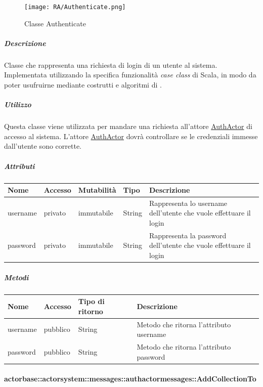 \documentclass{scalatekids-article}
\begin{document}
\begin{figure}[H]
  \begin{center}
    \texttt{[image: RA/Authenticate.png]}
    \caption{Classe Authenticate}
  \end{center}
\end{figure}

\subparagraph{Descrizione}
Classe che rappresenta una richiesta di login di un utente al sistema.\\Implementata utilizzando la specifica funzionalità \textit{case class} di Scala,
in modo da poter usufruirne mediante costrutti e algoritmi di
.

\subparagraph{Utilizzo}
Questa classe viene utilizzata per mandare una richiesta all'attore
\hyperref[sec:actorbase::actorsystem::actors::authactor::AuthActor]{AuthActor}
di accesso al sistema. L'attore \hyperref[sec:actorbase::actorsystem::actors::authactor::AuthActor]{AuthActor}
dovrà controllare se le credenziali immesse dall'utente sono corrette.

\subparagraph{Attributi}
\begin{tabular}{| p{2cm} | p{1.5cm} | p{2cm} | p{3cm} | p{8.5cm} |}
  \hline
  Nome & Accesso & Mutabilità & Tipo & Descrizione\\
  \hline
  username & privato & immutabile & String & Rappresenta lo username dell'utente che vuole effettuare il login \\
  \hline
  password & privato & immutabile & String & Rappresenta la password dell'utente che vuole effettuare il login \\
  \hline
\end{tabular}

\subparagraph{Metodi}
\begin{tabular}{| p{3cm} | p{1.5cm} | p{3.5cm} | p{9cm} |}
  \hline
  Nome & Accesso & Tipo di ritorno & Descrizione\\
  \hline
  username & pubblico & String & Metodo che ritorna l'attributo username\\
  \hline
  password & pubblico & String & Metodo che ritorna l'attributo password\\
  \hline
\end{tabular}

\paragraph{actorbase::actorsystem::messages::authactormessages::AddCollectionTo}
\label{sec:actorbase::actorsystem::messages::authactormessages::AddCollectionTo}
\end{document}
